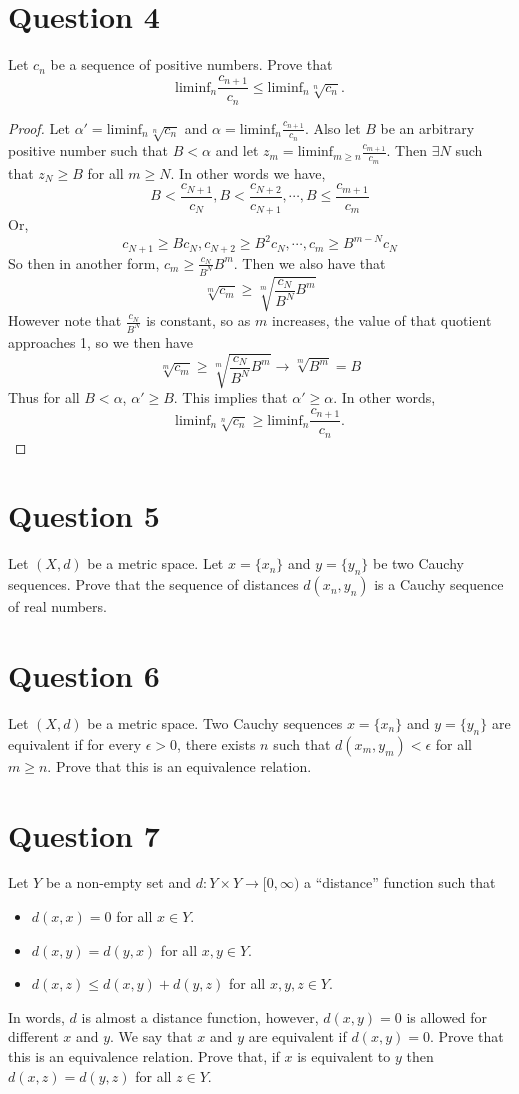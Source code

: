 \documentclass[12pt, letterpaper]{article}
\begin{document}
\section*{Question 4}
Let $c_n$ be a sequence of positive numbers. Prove that
\[
\mathrm{liminf}_n \frac{c_{n+1}}{c_n} \leq \mathrm{liminf}_n \sqrt[n]{c_n}.
\]
\begin{proof}
  Let $\alpha'= \mathrm{liminf}_n \sqrt[n]{c_n}$ and $\alpha = \mathrm{liminf}_n \frac{c_{n+1}}{c_n}$. Also let $B$ be an arbitrary positive number such that $B < \alpha$ and let $z_m = \mathrm{liminf}_{m \geq n} \frac{c_{m+1}}{c_m}$. Then $\exists N$ such that $z_N \geq B$ for all $m \geq N$. In other words we have,
  $$ B < \frac{c_{N + 1}}{c_N}, B < \frac{c_{N + 2}}{c_{N + 1}}, \cdots, B \leq \frac{c_{m + 1}}{c_m}$$
  Or,
  $$ c_{N+1} \geq Bc_N, c_{N+2} \geq B^2c_N, \cdots, c_m \geq B^{m - N}c_N $$
  So then in another form, $c_m \geq \frac{c_N}{B^N}B^m$. Then we also have that
  $$ \sqrt[m]{c_m} \geq \sqrt[m]{\frac{c_N}{B^N}B^m} $$
  However note that $\frac{c_N}{B^N}$ is constant, so as $m$ increases, the value of that quotient approaches 1, so we then have
  $$ \sqrt[m]{c_m} \geq \sqrt[m]{\frac{c_N}{B^N}B^m} \to \sqrt[m]{B^m} = B$$
  Thus for all $B < \alpha$, $\alpha' \geq B$. This implies that $\alpha' \geq \alpha$. In other words,
  \[
  \mathrm{liminf}_n \sqrt[n]{c_n} \geq \mathrm{liminf}_n \frac{c_{n+1}}{c_n}.
  \]
\end{proof}
\pagebreak

\section*{Question 5}
Let $(X,d)$ be a metric space.  Let $x=\{x_n\}$ and $y=\{y_n\}$ be two Cauchy sequences.
Prove that the sequence of distances $d(x_n,y_n)$ is a Cauchy sequence of real numbers.


\section*{Question 6}
Let $(X,d)$ be a metric space.  Two Cauchy sequences $x=\{x_n\}$ and $y=\{y_n\}$ are equivalent if for every $\epsilon >0$, there exists $n$ such that
$d(x_m,y_m ) < \epsilon$ for all $m\geq n$. Prove that this is an equivalence relation.

\section*{Question 7}
Let $Y$ be a non-empty set and $d: Y \times Y\rightarrow [0, \infty)$ a ``distance'' function such that
\begin{itemize}
\item $d(x,x)=0$  for all $x\in Y$.
\item $d(x,y)=d(y,x)$  for all $x,y\in Y$.
\item $d(x,z) \leq d(x,y) + d(y,z)$ for all $x,y,z\in Y$.
\end{itemize}
In words, $d$ is almost a distance function, however, $d(x,y)=0$ is allowed for different $x$ and $y$. We say that $x$ and $y$ are
equivalent if $d(x,y)=0$. Prove that this is an equivalence relation. Prove that, if $x$ is equivalent to $y$ then $d(x,z)=d(y,z)$ for all $z\in Y$.
\end{document}
